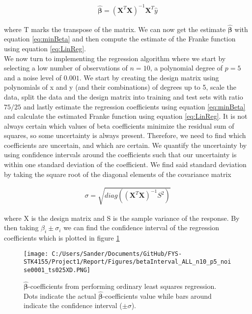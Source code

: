 \documentclass[12pt,a4paper]{article}
\begin{document}
\begin{equation}\label{eq:minBeta}
\begin{aligned}
\hat{\boldsymbol{\beta}} = (\textbf{X}^T\textbf{X})^{-1}\textbf{X}^T \hat{y}
\end{aligned}
\end{equation}

\noindent where T marks the transpose of the matrix. We can now get the estimate $\hat{\boldsymbol{\beta}}$ with equation \ref{eq:minBeta} and then compute the estimate of the Franke function using equation \ref{eq:LinReg}.
\\
We now turn to implementing the regression algorithm where we start by selecting a low number of observations of $n = 10$, a polynomial degree of $p = 5$ and a noise level of $0.001$. We start by creating the design matrix using polynomials of x and y (and their combinations) of degrees up to 5, scale the data, split the data and the design matrix into training and test sets with ratio $75/25$ and lastly estimate the regression coefficients using equation \ref{eq:minBeta} and calculate the estimated Franke function using equation \ref{eq:LinReg}. It is not always certain which values of beta coefficients minimize the residual sum of squares, so some uncertainty is always present. Therefore, we need to find which coefficients are uncertain, and which are certain. We quantify the uncertainty by using confidence intervals around the coefficients such that our uncertainty is within one standard deviation of the coefficient. We find said standard deviation by taking the square root of the diagonal elements of the covariance matrix 

\begin{equation}\label{eq:diagCOV}
\begin{aligned}
\sigma = \sqrt{diag((\textbf{X}^T\textbf{X})^{-1}S^2)}
\end{aligned}
\end{equation}

\noindent where X is the design matrix and S is the sample variance of the response. By then taking $\beta_i \pm \sigma_i$ we can find the confidence interval of the regression coefficients which is plotted in figure \ref{fig:betaIntALL1}

\begin{figure}[H]
\centering
\texttt{[image: C:/Users/Sander/Documents/GitHub/FYS-STK4155/Project1/Report/Figures/betaInterval\_ALL\_n10\_p5\_noise0001\_ts025XD.PNG]}
\caption{\label{fig:betaIntALL1} $\hat{\boldsymbol{\beta}}$-coefficients from performing ordinary least squares regression. Dots indicate the actual $\hat{\boldsymbol{\beta}}$-coefficients value while bars around indicate the confidence interval ($\pm \sigma$).}
\end{figure}
\end{document}
